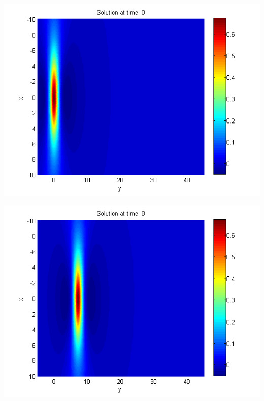 \documentclass[a0,portrait]{a0poster}
\begin{document}
\begin{multicols}{2}
\begin{center}\vspace{0.4cm}
	\begin{minipage}[b]{0.30\linewidth}
		\includegraphics[width=\linewidth]{figures/Solution1_t=0.png}
	\end{minipage}	
	\begin{minipage}[b]{0.30\linewidth}
		\includegraphics[width=\linewidth]{figures/Solution1_t=8.png}
	\end{minipage}	
	\begin{minipage}[b]{0.30\linewidth}

\end{minipage}
\end{center}
\end{multicols}
\end{document}
